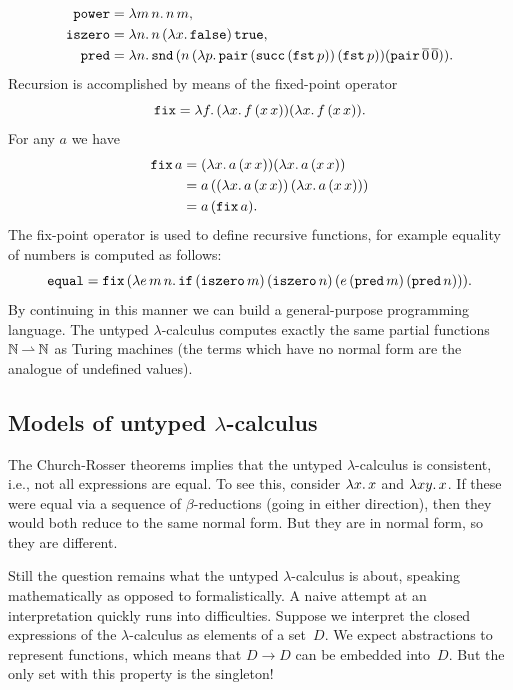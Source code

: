 %
\begin{align*}
  \mathtt{power} &= \lambda m\,n .\,n\,m,\\
  \mathtt{iszero} &= \lambda n .\,n\, (\lambda x .\,\mathtt{false})\, \mathtt{true},\\
  \mathtt{pred} &=
    \lambda n .\,
      \mathtt{snd}\, (n\, (\lambda p .\,
        \mathtt{pair}\, (\mathtt{succ}\, (\mathtt{fst}\, p))\,
        (\mathtt{fst}\, p))
      (\mathtt{pair}\, \overline{0}\, \overline{0})).
\end{align*}
%
Recursion is accomplished by means of the fixed-point operator
%
\begin{equation*}
  \mathtt{fix} = \lambda f .\,(\lambda x .\,f\,(x\,x)) (\lambda x .\,f\,(x\,x)).
\end{equation*}
%
For any $a$ we have
%
\begin{align*}
  \mathtt{fix}\,a &=
  (\lambda x .\,a\,(x\,x)) (\lambda x .\,a\,(x\,x)) \\
  &= a\,((\lambda x .\,a\,(x\,x))\,(\lambda x .\,a\,(x\,x))) \\
  &= a\,(\mathtt{fix}\,a).
\end{align*}
%
The fix-point operator is used to define recursive functions, for
example equality of numbers is computed as follows:
%
\begin{equation*}
  \mathtt{equal} = \mathtt{fix}\,(\lambda e\,m\,n .\,
    \mathtt{if}\,
    (\mathtt{iszero}\,m)\,
    (\mathtt{iszero}\,n)\,
    (e\,(\mathtt{pred}\,m)\,(\mathtt{pred}\,n))).
\end{equation*}
%
By continuing in this manner we can build a general-purpose
programming language. The untyped $\lambda$-calculus computes exactly
the same partial functions $\mathbb{N} \mathbin{\rightharpoonup} \mathbb{N}$ as Turing machines (the
terms which have no normal form are the analogue of undefined values).


\subsection{Models of untyped $\lambda$-calculus}
\label{sec:models-untyped-lambda-calculus}

The Church-Rosser theorems implies that the untyped $\lambda$-calculus
is consistent, i.e., not all expressions are equal. To see this,
consider $\lambda x .\,x$ and $\lambda x y .\,x$. If these were equal via
a sequence of $\beta$-reductions (going in either direction), then
they would both reduce to the same normal form. But they are in normal
form, so they are different.

Still the question remains what the untyped $\lambda$-calculus is
about, speaking mathematically as opposed to formalistically. A naive
attempt at an interpretation quickly runs into difficulties. Suppose
we interpret the closed expressions of the $\lambda$-calculus as
elements of a set~$D$. We expect abstractions to represent functions,
which means that $D \to D$ can be embedded into~$D$. But the only set
with this property is the singleton!

